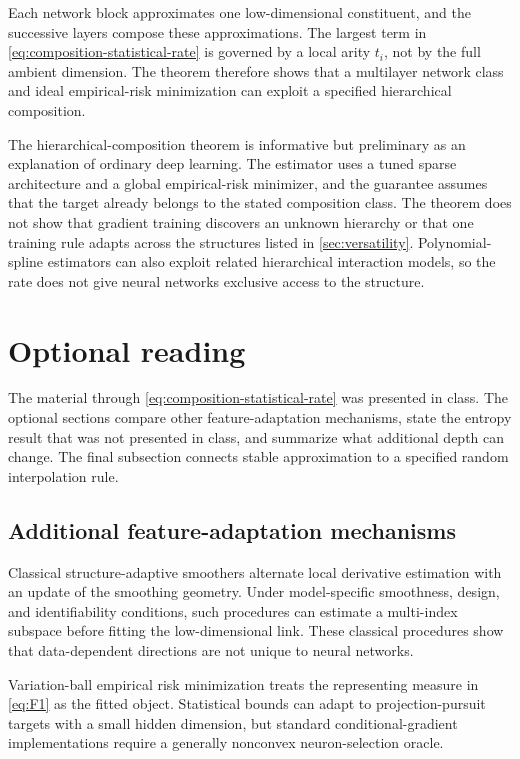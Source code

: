 \documentclass[11pt,twoside]{article}
\theoremstyle{definition}
\theoremstyle{remark}
\begin{document}
Each network block approximates one low-dimensional constituent, and the
successive layers compose these approximations. The largest term in
\cref{eq:composition-statistical-rate} is governed by a local arity \(t_i\),
not by the full ambient dimension. The theorem therefore shows that a
multilayer network class and ideal empirical-risk minimization can exploit a
specified hierarchical composition.

The hierarchical-composition theorem is informative but preliminary as an
explanation of ordinary deep learning. The estimator uses a tuned sparse
architecture and a global empirical-risk minimizer, and the guarantee assumes
that the target already
belongs to the stated composition class. The theorem does not show that
gradient training discovers an unknown hierarchy or that one training rule
adapts across the structures listed in \cref{sec:versatility}. Polynomial-
spline estimators can also exploit related hierarchical interaction models,
so the rate does not give neural networks exclusive access to the structure.

\section{Optional reading}
\label{sec:optional}

The material through \cref{eq:composition-statistical-rate} was presented in
class. The optional sections compare other feature-adaptation mechanisms, state the
entropy result that was not presented in class, and summarize what additional
depth can change. The final subsection connects stable approximation to a
specified random interpolation rule.

\subsection{Additional feature-adaptation mechanisms}

Classical structure-adaptive smoothers alternate local derivative estimation
with an update of the smoothing geometry. Under model-specific smoothness,
design, and identifiability conditions, such procedures can estimate a
multi-index subspace before fitting the low-dimensional link. These classical
procedures show that
data-dependent directions are not unique to neural networks.

Variation-ball empirical risk minimization treats the representing measure in
\cref{eq:F1} as the fitted object. Statistical bounds can adapt to
projection-pursuit targets with a small hidden dimension, but standard
conditional-gradient implementations require a generally nonconvex
neuron-selection oracle.
\end{document}
